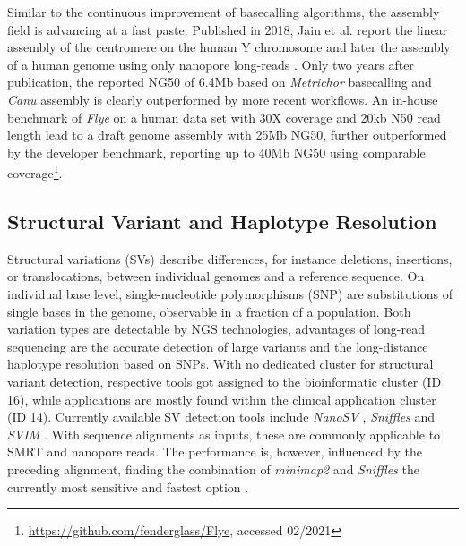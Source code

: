 Similar to the continuous improvement of basecalling algorithms, the assembly field is advancing at a fast paste.
Published in 2018, Jain et al. report the linear assembly of the centromere on the human Y chromosome and later the assembly of a human genome using only nanopore long-reads \cite{Jain2018, Jain2018b}.
Only two years after publication, the reported NG50 of 6.4Mb based on \textit{Metrichor} basecalling and \textit{Canu} assembly is clearly outperformed by more recent workflows.
An in-house benchmark of \textit{Flye} on a human data set with 30X coverage and 20kb N50 read length lead to a draft genome assembly with 25Mb NG50, further outperformed by the developer benchmark, reporting up to 40Mb NG50 using comparable coverage\footnote{\url{https://github.com/fenderglass/Flye}, accessed 02/2021}.




\subsection{Structural Variant and Haplotype Resolution}
\label{subsec:state_of_art:sv}

Structural variations (SVs) describe differences, for instance deletions, insertions, or translocations, between individual genomes and a reference sequence.
On individual base level, single-nucleotide polymorphisms (SNP) are substitutions of single bases in the genome, observable in a fraction of a population.
Both variation types are detectable by NGS technologies, advantages of long-read sequencing are the accurate detection of large variants and the long-distance haplotype resolution based on SNPs.
With no dedicated cluster for structural variant detection, respective tools got assigned to the bioinformatic cluster (ID 16), while applications are mostly found within the clinical application cluster (ID 14).
Currently available SV detection tools include \textit{NanoSV} \cite{Stancu2017}, \textit{Sniffles} \cite{Sedlazeck2018} and \textit{SVIM} \cite{Heller2019}.
With sequence alignments as inputs, these are commonly applicable to SMRT and nanopore reads.
The performance is, however, influenced by the preceding alignment, finding the combination of \textit{minimap2} and \textit{Sniffles} the currently most sensitive and fastest option \cite{Coster2019}.

